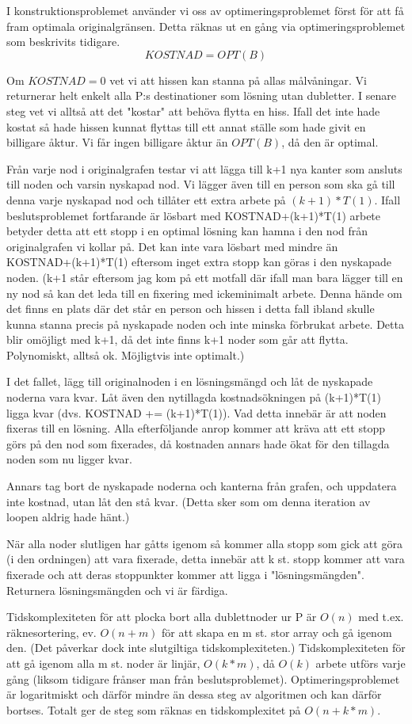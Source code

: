 \documentclass[a4paper,10pt,twoside]{article}
\begin{document}
I konstruktionsproblemet använder vi oss av optimeringsproblemet först för att få fram optimala originalgränsen. Detta räknas ut en gång via optimeringsproblemet som beskrivits tidigare. $$KOSTNAD = OPT(B)$$

Om $KOSTNAD = 0$ vet vi att hissen kan stanna på allas målvåningar. Vi returnerar helt enkelt alla P:s destinationer som lösning utan dubletter. I senare steg vet vi alltså att det "kostar" att behöva flytta en hiss. Ifall det inte hade kostat så hade hissen kunnat flyttas till ett annat ställe som hade givit en billigare åktur. Vi får ingen billigare åktur än $OPT(B)$, då den är optimal.

Från varje nod i originalgrafen testar vi att lägga till k+1 nya kanter som ansluts till noden och varsin nyskapad nod. Vi lägger även till en person som ska gå till denna varje nyskapad nod och tillåter ett extra arbete på $(k+1)*T(1)$. Ifall beslutsproblemet fortfarande är lösbart med KOSTNAD+(k+1)*T(1) arbete betyder detta att ett stopp i en optimal lösning kan hamna i den nod från originalgrafen vi kollar på. Det kan inte vara lösbart med mindre än KOSTNAD+(k+1)*T(1) eftersom inget extra stopp kan göras i den nyskapade noden. (k+1 står eftersom jag kom på ett motfall där ifall man bara lägger till en ny nod så kan det leda till en fixering med ickeminimalt arbete. Denna hände om det finns en plats där det står en person och hissen i detta fall ibland skulle kunna stanna precis på nyskapade noden och inte minska förbrukat arbete. Detta blir omöjligt med k+1, då det inte finns k+1 noder som går att flytta. Polynomiskt, alltså ok. Möjligtvis inte optimalt.)

I det fallet, lägg till originalnoden i en lösningsmängd och låt de nyskapade noderna vara kvar. Låt även den nytillagda kostnadsökningen på (k+1)*T(1) ligga kvar (dvs. KOSTNAD += (k+1)*T(1)). Vad detta innebär är att noden fixeras till en lösning. Alla efterföljande anrop kommer att kräva att ett stopp görs på den nod som fixerades, då kostnaden annars hade ökat för den tillagda noden som nu ligger kvar.

Annars tag bort de nyskapade noderna och kanterna från grafen, och uppdatera inte kostnad, utan låt den stå kvar. (Detta sker som om denna iteration av loopen aldrig hade hänt.)

När alla noder slutligen har gåtts igenom så kommer alla stopp som gick att göra (i den ordningen) att vara fixerade, detta innebär att k st. stopp kommer att vara fixerade och att deras stoppunkter kommer att ligga i "lösningsmängden". Returnera lösningsmängden och vi är färdiga.

Tidskomplexiteten för att plocka bort alla dublettnoder ur P är $O(n)$ med t.ex. räknesortering, ev. $O(n+m)$ för att skapa en m st. stor array och gå igenom den. (Det påverkar dock inte slutgiltiga tidskomplexiteten.) Tidskomplexiteten för att gå igenom alla m st. noder är linjär, $O(k*m)$, då $O(k)$ arbete utförs varje gång (liksom tidigare frånser man från beslutsproblemet). Optimeringsproblemet är logaritmiskt och därför mindre än dessa steg av algoritmen och kan därför bortses. Totalt ger de steg som räknas en tidskomplexitet på $O(n+k*m)$.
\end{document}
